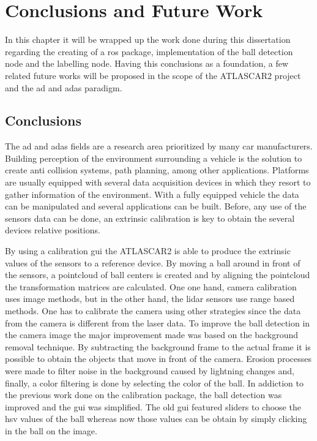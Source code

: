 
\chapter{Conclusions and Future Work}

In this chapter it will be wrapped up the work done during this dissertation regarding the creating of a \gls{ros} package, implementation of the ball detection node and the labelling node. Having this conclusions as a foundation, a few related future works will be proposed in the scope of the ATLASCAR2 project and the \gls{ad} and \gls{adas} paradigm.

\section{Conclusions}

The \gls{ad} and \gls{adas} fields are a research area prioritized by many car manufacturers. Building perception of the environment surrounding a vehicle is the solution to create anti collision systems, path planning, among other applications. Platforms are usually equipped with several data acquisition devices in which they resort to gather information of the environment. With a fully equipped vehicle the data can be manipulated and several applications can be built. Before, any use of the sensors data can be done, an extrinsic calibration is key to obtain the several devices relative positions. 

By using a calibration \gls{gui} the ATLASCAR2 is able to produce the extrinsic values of the sensors to a reference device. By moving a ball around in front of the sensors, a pointcloud of ball centers is created and by aligning the pointcloud the transformation matrices are calculated. One one hand, camera calibration uses image methods, but in the other hand, the \gls{lidar} sensors use range based methods. One has to calibrate the camera using other strategies since the data from the camera is different from the laser data. To improve the ball detection in the camera image the major improvement made was based on the background removal technique. By subtracting the background frame to the actual frame it is possible to obtain the objects that move in front of the camera. Erosion processes were made to filter noise in the background caused by lightning changes and, finally, a color filtering is done by selecting the color of the ball. In addiction to the previous work done on the calibration package, the ball detection was improved and the \gls{gui} was simplified. The old \gls{gui} featured sliders to choose the \gls{hsv} values of the ball whereas now those values can be obtain by simply clicking in the ball on the image.

